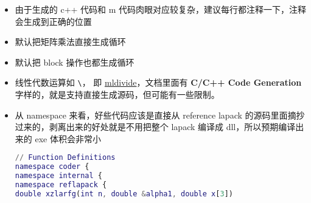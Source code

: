 \begin{itemize}
\begin{lstlisting}[language=matlab]
% 解线性方程组
% A = rand(30,30);
A = rand(30,30);
% ret=ret+ sprintf('sum(A) = %0.5e\n', sum(A(:)));
ret=ret+ sprintf('sum(A) = %0.5e\n', sum(A(:)));
% X = rand(30,100);
X = rand(30,100);
% ret=ret+ sprintf('sum(X) = %0.5e\n', sum(X(:)));
ret=ret+ sprintf('sum(X) = %0.5e\n', sum(X(:)));
% B = A * X;
B = A * X;
% ret=ret+ sprintf('sum(B) = %0.5e\n', sum(B(:)));
ret=ret+ sprintf('sum(B) = %0.5e\n', sum(B(:)));
% X1 = A \ B;
X1 = A \ B;
% ret=ret+ sprintf('sum(X1) = %0.5e\n', sum(X1(:)));
ret=ret+ sprintf('sum(X1) = %0.5e\n', sum(X1(:)));
% if norm(X-X1) > 1e-10
if norm(X-X1) > 1e-10
    % ret=ret+ sprintf('error: norm(X-X1) = %0.5e\n', norm(X-X1));
    ret=ret+ sprintf('error: norm(X-X1) = %0.5e\n', norm(X-X1));
end

% 本征问题
% A = A + A.';
A = A + A.';
% ret=ret+ sprintf('sum(A) = %0.5e\n', sum(A(:)));
ret=ret+ sprintf('sum(A) = %0.5e\n', sum(A(:)));
% [V, D] = eig(A);
[V, D] = eig(A);
% err = max(max(abs(A*V - V*D)));
err = max(max(abs(A*V - V*D)));
% if err > 1e-10
if err > 1e-10
    % ret=ret+ sprintf('error: err = %0.5e\n', err);
    ret=ret+ sprintf('error: err = %0.5e\n', err);
end
end

\end{lstlisting}
\item 由于生成的 c++ 代码和 m 代码肉眼对应较复杂，建议每行都注释一下，注释会生成到正确的位置
\item 默认把矩阵乘法直接生成循环
\item 默认把 block 操作也都生成循环
\item 线性代数运算如 \verb`\`， 即 \href{https://www.mathworks.com/help/releases/R2024b/matlab/ref/double.mldivide.html}{mldivide}，文档里面有 \textbf{C/C++ Code Generation} 字样的，就是支持直接生成源码，但可能有一些限制。
\item 从 namespace 来看，好些代码应该是直接从 reference lapack 的源码里面摘抄过来的，剥离出来的好处就是不用把整个 lapack 编译成 dll，所以预期编译出来的 exe 体积会非常小
\begin{lstlisting}[language=matlab]
// Function Definitions
namespace coder {
namespace internal {
namespace reflapack {
double xzlarfg(int n, double &alpha1, double x[3])
\end{lstlisting}
\end{itemize}
